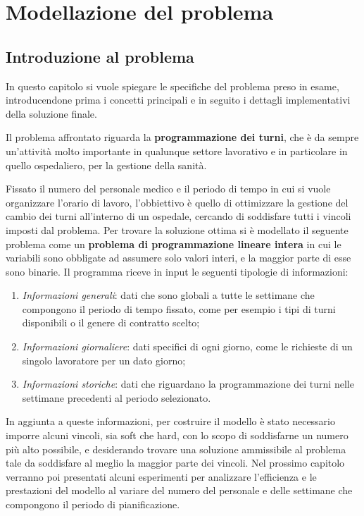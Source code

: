 \chapter{Modellazione del problema}\label{ch:chapter2}

\section{Introduzione al problema}
In questo capitolo si vuole spiegare le specifiche del problema preso in esame, introducendone prima i concetti principali e in seguito i dettagli implementativi della soluzione finale.

Il problema affrontato riguarda la \textbf{programmazione dei turni}, che è da sempre un'attività molto importante in qualunque settore lavorativo e in particolare in quello ospedaliero, per la gestione della sanità.

Fissato il numero del personale medico e il periodo di tempo in cui si vuole organizzare l'orario di lavoro, l'obbiettivo è quello di ottimizzare la gestione del cambio dei turni all'interno di un ospedale, cercando di soddisfare tutti i vincoli imposti dal problema.
Per trovare la soluzione ottima si è modellato il seguente problema come un \textbf{problema di programmazione lineare intera} in cui le variabili sono obbligate ad assumere solo valori interi, e la maggior parte di esse sono binarie.
Il programma riceve in input le seguenti tipologie di informazioni:
\begin{enumerate}
\item \textit{Informazioni generali}: dati che sono globali a tutte le settimane che compongono il periodo di tempo fissato, come per esempio i tipi di turni disponibili o il genere di contratto scelto;
\item \textit{Informazioni giornaliere}: dati specifici di ogni giorno, come le richieste di un singolo lavoratore per un dato giorno;
\item \textit{Informazioni storiche}: dati che riguardano la programmazione dei turni nelle settimane precedenti al periodo selezionato.
\end{enumerate}

In aggiunta a queste informazioni, per costruire il modello è stato necessario imporre alcuni vincoli, sia soft che hard, con lo scopo di soddisfarne un numero più alto possibile, e desiderando trovare una soluzione ammissibile al problema tale da soddisfare al meglio la maggior parte dei vincoli.
Nel prossimo capitolo verranno poi presentati alcuni esperimenti per analizzare l'efficienza e le prestazioni del modello al variare del numero del personale e delle settimane che compongono il periodo di pianificazione.

